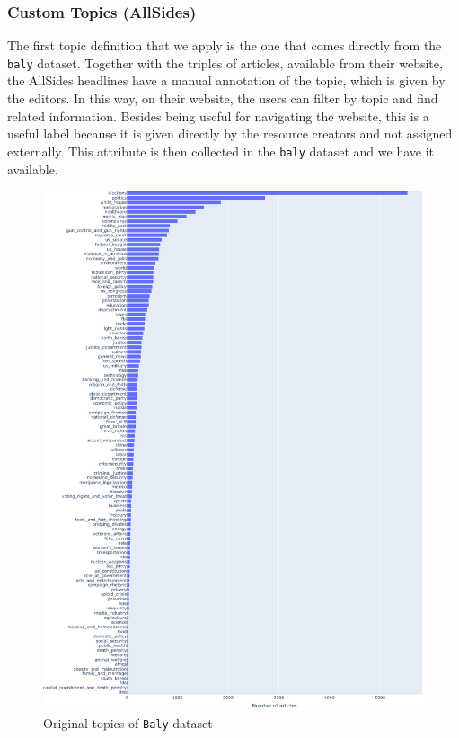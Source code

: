 
\subsubsection{\statusgreen Custom Topics (AllSides)}

The first topic definition that we apply is the one that comes directly from the \texttt{baly} dataset. Together with the triples of articles, available from their website, the AllSides headlines have a manual annotation of the topic, which is given by the editors. In this way, on their website, the users can filter by topic and find related information.
Besides being useful for navigating the website, this is a useful label because it is given directly by the resource creators and not assigned externally.
This attribute is then collected in the \texttt{baly} dataset and we have it available.

\begin{figure}[!htbp]
    \centering
    \includegraphics[width=\linewidth]{figures/baly_original_topics.pdf}
    \caption{Original topics of \texttt{Baly} dataset}
    \label{fig:baly_original_topics}
\end{figure}

